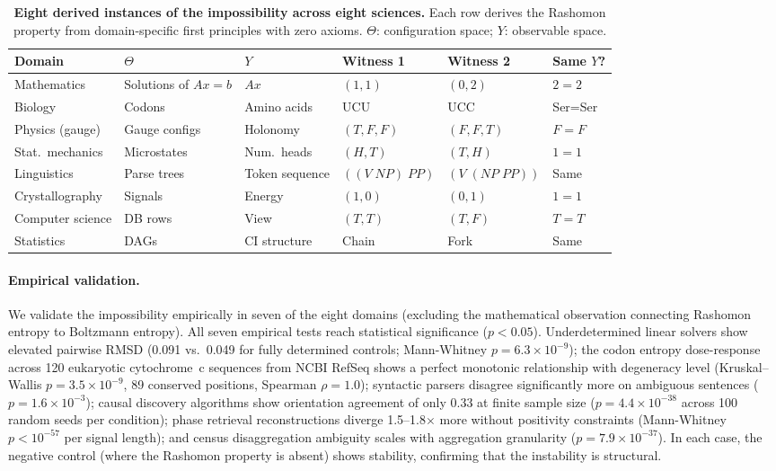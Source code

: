 \documentclass[11pt]{article}
\begin{document}
\begin{table}[t]
\centering
\caption{\textbf{Eight derived instances of the impossibility across eight
  sciences.}  Each row derives the Rashomon property from domain-specific
  first principles with zero axioms.  $\Theta$: configuration space; $Y$:
  observable space.}
\label{tab:unification}
\small
\begin{tabular}{@{}llllll@{}}
\toprule
Domain & $\Theta$ & $Y$ & Witness 1 & Witness 2 & Same $Y$? \\
\midrule
Mathematics       & Solutions of $Ax=b$  & $Ax$            & $(1,1)$  & $(0,2)$  & $2=2$ \\
Biology           & Codons               & Amino acids     & UCU      & UCC      & Ser=Ser \\
Physics (gauge)   & Gauge configs        & Holonomy        & $(T,F,F)$& $(F,F,T)$& $F=F$ \\
Stat.\ mechanics  & Microstates          & Num.\ heads     & $(H,T)$  & $(T,H)$  & $1=1$ \\
Linguistics       & Parse trees          & Token sequence  & $((V\;NP)\;PP)$ & $(V\;(NP\;PP))$ & Same \\
Crystallography   & Signals              & Energy          & $(1,0)$  & $(0,1)$  & $1=1$ \\
Computer science  & DB rows              & View            & $(T,T)$  & $(T,F)$  & $T=T$ \\
Statistics        & DAGs                 & CI structure    & Chain    & Fork     & Same \\
\bottomrule
\end{tabular}
\end{table}

\paragraph{Empirical validation.}
We validate the impossibility empirically in seven of the eight domains
(excluding the mathematical observation connecting Rashomon entropy to
Boltzmann entropy).  All seven empirical tests reach statistical significance
($p < 0.05$).  Underdetermined linear solvers show elevated pairwise RMSD
(0.091 vs.\ 0.049 for fully determined controls; Mann-Whitney
$p = 6.3 \times 10^{-9}$); the codon entropy dose-response across 120 eukaryotic cytochrome~c
sequences from NCBI RefSeq shows a perfect monotonic relationship with
degeneracy level (Kruskal--Wallis $p = 3.5 \times 10^{-9}$, 89 conserved positions, Spearman
$\rho = 1.0$); syntactic parsers disagree significantly more on ambiguous
sentences ($p = 1.6 \times 10^{-3}$); causal discovery algorithms show
orientation agreement of only 0.33 at finite sample size ($p = 4.4 \times
10^{-38}$ across 100 random seeds per condition); phase retrieval
reconstructions diverge 1.5--1.8$\times$ more without positivity constraints
(Mann-Whitney $p < 10^{-57}$ per signal length); and census disaggregation
ambiguity scales with aggregation granularity ($p = 7.9 \times 10^{-37}$).  In each case,
the negative control (where the Rashomon property is absent) shows stability,
confirming that the instability is structural.
\end{document}
